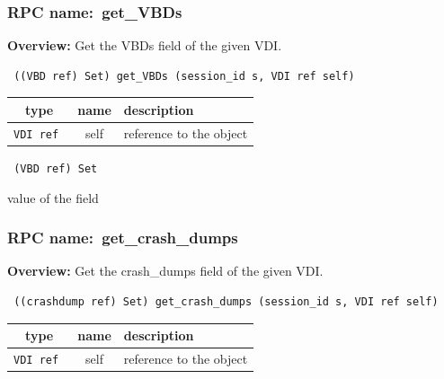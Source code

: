 \vspace{0.3cm}
\vspace{0.3cm}
\vspace{0.3cm}
\subsubsection{RPC name:~get\_VBDs}

{\bf Overview:} 
Get the VBDs field of the given VDI.

\begin{verbatim} ((VBD ref) Set) get_VBDs (session_id s, VDI ref self)\end{verbatim}



 
\vspace{0.3cm}
\begin{tabular}{|c|c|p{7cm}|}
 \hline
{\bf type} & {\bf name} & {\bf description} \\ \hline
{\tt VDI ref } & self & reference to the object \\ \hline 

\end{tabular}

\vspace{0.3cm}

{\tt 
(VBD ref) Set
}


value of the field
\vspace{0.3cm}
\vspace{0.3cm}
\vspace{0.3cm}
\subsubsection{RPC name:~get\_crash\_dumps}

{\bf Overview:} 
Get the crash\_dumps field of the given VDI.

\begin{verbatim} ((crashdump ref) Set) get_crash_dumps (session_id s, VDI ref self)\end{verbatim}



 
\vspace{0.3cm}
\begin{tabular}{|c|c|p{7cm}|}
 \hline
{\bf type} & {\bf name} & {\bf description} \\ \hline
{\tt VDI ref } & self & reference to the object \\ \hline 

\end{tabular}

